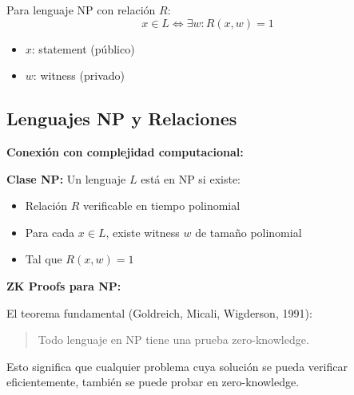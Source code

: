 \documentclass[11pt,a4paper,twoside,openright]{book}
\theoremstyle{definition}
\theoremstyle{plain}
\theoremstyle{remark}
\begin{document}
Para lenguaje NP con relación $R$:
\[
x \in L \iff \exists w : R(x, w) = 1
\]

\begin{itemize}
    \item $x$: statement (público)
    \item $w$: witness (privado)
\end{itemize}

\subsection{Lenguajes NP y Relaciones}

\begin{mathnote}
\textbf{Conexión con complejidad computacional:}

\textbf{Clase NP:}
Un lenguaje $L$ está en NP si existe:
\begin{itemize}
    \item Relación $R$ verificable en tiempo polinomial
    \item Para cada $x \in L$, existe witness $w$ de tamaño polinomial
    \item Tal que $R(x, w) = 1$
\end{itemize}

\textbf{ZK Proofs para NP:}

El teorema fundamental (Goldreich, Micali, Wigderson, 1991):
\begin{quote}
Todo lenguaje en NP tiene una prueba zero-knowledge.
\end{quote}

Esto significa que cualquier problema cuya solución se pueda verificar eficientemente, también se puede probar en zero-knowledge.
\end{mathnote}
\end{document}
